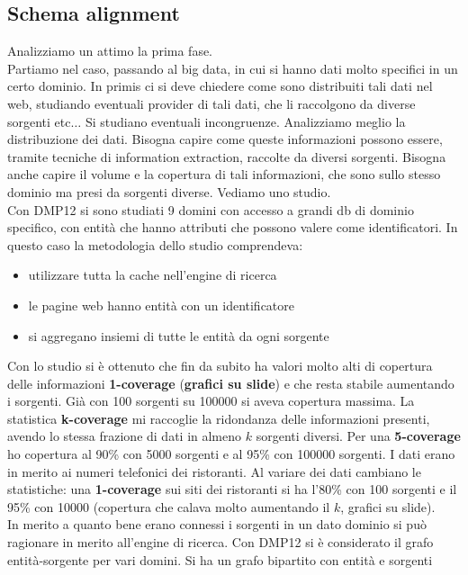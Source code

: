 \documentclass[a4paper,12pt, oneside]{book}
\begin{document}
\subsection{Schema alignment}
Analizziamo un attimo la prima fase.\\
Partiamo nel caso, passando al big data, in cui si hanno dati molto specifici in
un certo dominio. In primis ci si deve chiedere come sono distribuiti tali dati
nel web, studiando eventuali provider di tali dati, che li raccolgono da diverse
sorgenti etc$\ldots$ Si studiano eventuali incongruenze. Analizziamo meglio la
distribuzione dei dati. Bisogna capire come queste informazioni possono essere,
tramite tecniche di information extraction, raccolte da diversi
sorgenti. Bisogna anche capire il volume e la copertura di tali informazioni,
che sono sullo stesso dominio ma presi da sorgenti diverse. Vediamo uno
studio.\\
Con DMP12 si sono studiati 9 domini con accesso a grandi db di dominio
specifico, con entità che hanno attributi che possono valere come
identificatori. In questo caso la metodologia dello studio comprendeva:
\begin{itemize}
  \item utilizzare tutta la cache nell'engine di ricerca
  \item le pagine web hanno entità con un identificatore
  \item si aggregano insiemi di tutte le entità da ogni sorgente
\end{itemize}
Con lo studio si è ottenuto che fin da subito ha valori molto alti di copertura
delle informazioni \textbf{1-coverage} (\textbf{grafici su slide}) e che resta
stabile aumentando i sorgenti. Già con 100 sorgenti su 100000 si aveva copertura
massima. La statistica \textbf{k-coverage} mi raccoglie la ridondanza delle
informazioni presenti, avendo lo stessa frazione di dati in almeno $k$ sorgenti
diversi. Per una \textbf{5-coverage} ho copertura al 90\% con 5000 sorgenti e al
95\% con 100000 sorgenti. I dati erano in merito ai numeri telefonici dei
ristoranti. Al variare dei dati cambiano le statistiche: una \textbf{1-coverage}
sui siti dei ristoranti si ha l'80\% con 100 sorgenti e il 95\% con 10000
(copertura che calava molto aumentando il $k$, grafici su slide).\\
In merito a quanto bene erano connessi i sorgenti in un dato dominio si può
ragionare in merito all'engine di ricerca. Con DMP12 si è considerato il grafo
entità-sorgente per vari domini. Si ha un grafo bipartito con entità e sorgenti
\end{document}

